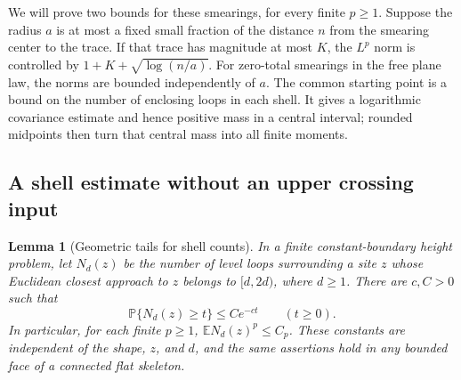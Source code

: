 \documentclass[11pt]{article}
\newcommand{\E}{\mathbb E}
\newcommand{\Prob}{\mathbb P}
\newtheorem{lemma}[theorem]{Lemma}
\theoremstyle{definition}
\theoremstyle{remark}
\numberwithin{equation}{section}
\begin{document}
We will prove two bounds for these smearings, for every finite $p\geq1$.
Suppose the radius $a$ is at most a fixed small fraction of the distance
$n$ from the smearing center to the trace.  If that trace has magnitude
at most $K$, the $L^p$ norm is controlled by
$1+K+\sqrt{\log(n/a)}$.  For zero-total smearings in the free plane
law, the norms are bounded independently of $a$.  The common starting point is a bound on the
number of enclosing loops in each shell.  It gives a logarithmic
covariance estimate and hence positive mass in a central interval;
rounded midpoints then turn that central mass into all finite moments.

\subsection{A shell estimate without an upper crossing input}

\begin{lemma}[Geometric tails for shell counts]\label{lem:shell-moments}
In a finite constant-boundary height problem, let $N_d(z)$ be the number
of level loops surrounding a site $z$ whose Euclidean closest approach
to $z$ belongs to $[d,2d)$, where $d\geq1$.  There are $c,C>0$ such that
\begin{equation}\label{moments:shell-tail}
 \Prob\{N_d(z)\geq t\}\leq Ce^{-ct}\qquad(t\geq0).
\end{equation}
In particular, for each finite $p\geq1$, $\E N_d(z)^p\leq C_p$.
These constants are independent of the shape, $z$, and $d$, and the
same assertions hold in any bounded face of a connected flat skeleton.
\end{lemma}
\end{document}
